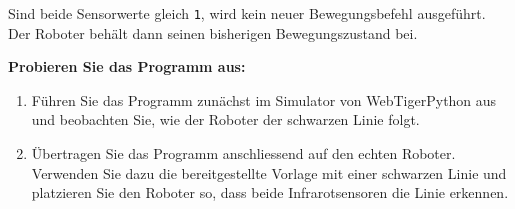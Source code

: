 \begin{myexample}
    Sind beide Sensorwerte gleich \texttt{1}, wird
    kein neuer Bewegungsbefehl ausgeführt. Der Roboter
    behält dann seinen bisherigen Bewegungszustand bei.

    \textbf{Probieren Sie das Programm aus:}
    \begin{enumerate}
        \item Führen Sie das Programm zunächst im Simulator
              von WebTigerPython aus und beobachten Sie,
              wie der Roboter der schwarzen Linie folgt.

        \item Übertragen Sie das Programm anschliessend
              auf den echten Roboter. Verwenden Sie dazu
              die bereitgestellte Vorlage mit einer
              schwarzen Linie und platzieren Sie den
              Roboter so, dass beide Infrarotsensoren
              die Linie erkennen.

    \end{enumerate}
\end{myexample}


